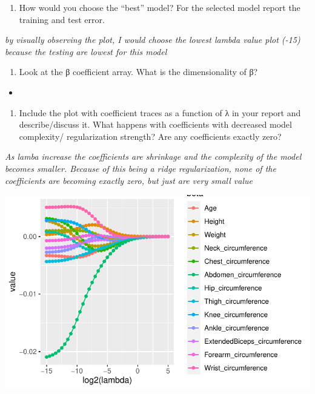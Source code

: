 \documentclass[
  letterpaper,
  DIV=11,
  numbers=noendperiod]{scrartcl}
\providecommand{\tightlist}{%
  \setlength{\itemsep}{0pt}\setlength{\parskip}{0pt}}\usepackage{longtable,booktabs,array}
\begin{document}
\begin{enumerate}
\def\labelenumi{(\alph{enumi})}
\setcounter{enumi}{7}
\tightlist
\item
  How would you choose the ``best'' model? For the selected model report
  the training and test error.
\end{enumerate}

\emph{by visually observing the plot, I would choose the lowest lambda
value plot (-15) because the testing are lowest for this model}

\begin{enumerate}
\def\labelenumi{(\roman{enumi})}
\tightlist
\item
  Look at the β coefficient array. What is the dimensionality of β?
\end{enumerate}

\begin{itemize}
\tightlist
\item
\end{itemize}

\begin{enumerate}
\def\labelenumi{(\alph{enumi})}
\setcounter{enumi}{9}
\tightlist
\item
  Include the plot with coefficient traces as a function of λ in your
  report and describe/discuss it. What happens with coefficients with
  decreased model complexity/ regularization strength? Are any
  coefficients exactly zero?
\end{enumerate}

\emph{As lamba increase the coefficients are shrinkage and the
complexity of the model becomes smaller. Because of this being a ridge
regularization, none of the coefficients are becoming exactly zero, but
just are very small value}

\includegraphics{excercise_doc_files/figure-pdf/unnamed-chunk-21-1.pdf}
\end{document}
